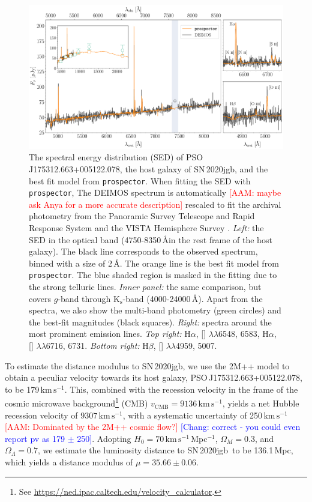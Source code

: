 \documentclass[twocolumn]{aastex631}
\newcommand{\sn}{SN\,2020jgb}
\newcommand{\kms}{$\mathrm{km}\,\mathrm{s}^{-1}$}
\newcommand{\adam}[1]{\textcolor{red}{[AAM: #1]}}
\newcommand{\chang}[1]{\textcolor{blue}{[Chang: #1]}}
\begin{document}
\begin{figure}
    \centering
    \includegraphics[width=\textwidth]{DEIMOS_20jgb.pdf}
    \caption{The spectral energy distribution (SED) of PSO J175312.663+005122.078, the host galaxy of \sn, and the best fit model from \texttt{prospector}. When fitting the SED with \texttt{prospector}, The DEIMOS spectrum is automatically \adam{maybe ask Anya for a more accurate description} rescaled to fit the archival photometry from the Panoramic Survey Telescope and Rapid Response System \citep[Pan-STARRS;][{\it g, r, i, z, y} Kron magnitudes]{PS1_2016}  and the VISTA Hemisphere Survey \citep[VHS;][J and $\mathrm{K}_\mathrm{s}$ Petrosian magnitudes]{VHS_2013}. {\it Left:} the SED in the optical band (4750-8350\,\AA in the rest frame of the host galaxy). The black line corresponds to the observed spectrum, binned with a size of 2\,\AA. The orange line is the best fit model from \texttt{prospector}. The blue shaded region is masked in the fitting due to the strong telluric lines. {\it Inner panel:} the same comparison, but covers $g$-band through $\mathrm{K_s}$-band (4000-24000\,\AA). Apart from the spectra, we also show the multi-band photometry (green circles) and the best-fit magnitudes (black squares). {\it Right:} spectra around the most prominent emission lines. {\it Top right:} H$\alpha$, [] $\lambda\lambda$6548, 6583, H$\alpha$, [] $\lambda\lambda$6716, 6731. {\it Bottom right:} H$\beta$, [] $\lambda\lambda$4959, 5007.}
    \label{fig:host_spec}
\end{figure}

To estimate the distance modulus to \sn, we use the 2M++ model \citep{Carrick2015_2M++} to obtain a peculiar velocity towards its host galaxy, PSO\,J175312.663+005122.078, to be 179\,\kms. This, combined with the recession velocity in the frame of the cosmic microwave background\footnote{See \url{https://ned.ipac.caltech.edu/velocity_calculator}.} (CMB) $v_\mathrm{CMB}=9136$\,\kms, yields a net Hubble recession velocity of $9307$\,\kms, with a systematic uncertainty of 250\,\kms \adam{Dominated by the 2M++ cosmic flow?} \chang{correct - you could even report pv as 179 $\pm$ 250}. Adopting $H_0=70$\,\kms\,Mpc$^{-1}$, $\Omega_M=0.3$, and $\Omega_\Lambda=0.7$, we estimate the luminosity distance to \sn\ to be 136.1\,Mpc, which yields a distance modulus of $\mu=35.66\pm0.06$.
\end{document}
